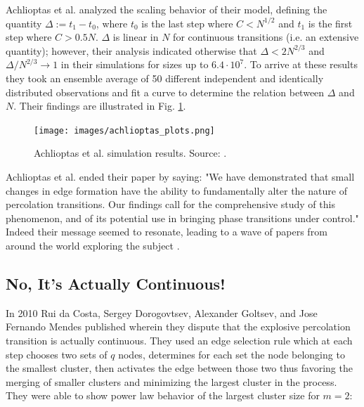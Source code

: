 Achlioptas et al. analyzed the scaling behavior of their model, defining the quantity $\Delta := t_1 - t_0$, where $t_0$ is the last step where $C < N^{1/2}$ and $t_1$ is the first step where $C > 0.5N$.
$\Delta$ is linear in $N$ for continuous transitions (i.e. an extensive quantity); however, their analysis indicated otherwise that $\Delta < 2N^{2/3}$ and $\Delta / N^{2/3} \rightarrow 1$ in their simulations for sizes up to $6.4 \cdot 10^7$.
To arrive at these results they took an ensemble average of 50 different independent and identically distributed observations and fit a curve to determine the relation between $\Delta$ and $N$.
Their findings are illustrated in Fig. \ref{fig:achlioptas_plots}.

\begin{figure}[H]
	\centering
	\texttt{[image: images/achlioptas\_plots.png]}
	\caption{Achlioptas et al. simulation results. Source: \cite{Achlioptas_1}.}
	\label{fig:achlioptas_plots}
\end{figure}

Achlioptas et al. ended their paper by saying: "We have demonstrated that small changes in edge formation have the ability to fundamentally alter the nature of percolation transitions. Our findings call for the comprehensive study of this phenomenon, and of its potential use in bringing phase transitions under control."
Indeed their message seemed to resonate, leading to a wave of papers from around the world exploring the subject \cite{Ziff_1, Cho_1, Radicchi_1, Friedman_1, Ziff_2, Radicchi_2, D_Souza_1, da_Costa_1, Rozenfeld_1, Araujo_1, Moreira_1, Cho_2, Cho_3, Nagler_1, Manna_1, Grassberger_1, Lee_1, Riordan_1, Hooyberghs_1, Nagler_2, Chen_1, Panagiotou_1, Pan_1, Cho_4, Gomez_1, Tian_1, Riordan_2, Riordan_3, Boettcher_1, Chen_2, Angst_1, Bizhani_1, Cho_5, Schroeder_1, Chen_3, Chen_4, Squires_1, Do_1, Chen_5, Bastas_1, Cho_6, da_Costa_2, Riordan_4, Guan_1, da_Costa_5, da_Costa_3, da_Costa_4, D_Souza_2, Hayasaka_1, Clusella_1, Boccaletti_1, Gedik_1, Rahman_1, Waagen_1, Zhu_1, Sabbir_1, Trevelyan_1, Sabbir_1}.



\subsection{No, It's Actually Continuous!}
\label{subsec:no_its_actually_continuous}
In 2010 Rui da Costa, Sergey Dorogovtsev, Alexander Goltsev, and Jose Fernando Mendes published \cite{da_Costa_1} wherein they dispute that the explosive percolation transition is actually continuous.
They used an edge selection rule which at each step chooses two sets of $q$ nodes, determines for each set the node belonging to the smallest cluster, then activates the edge between those two thus favoring the merging of smaller clusters and minimizing the largest cluster in the process.
They were able to show power law behavior of the largest cluster size for $m = 2$:

